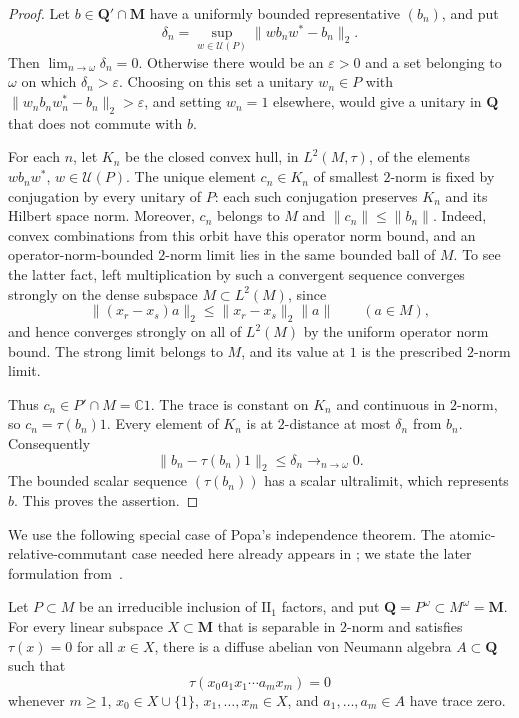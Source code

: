 \begin{proof}
Let $b\in\mathbf Q'\cap\mathbf M$ have a uniformly bounded
representative $(b_n)$, and put
\[
  \delta_n=\sup_{w\in\mathcal U(P)}
       \|wb_nw^*-b_n\|_2.
\]
Then $\lim_{n\to\omega}\delta_n=0$.  Otherwise there would be an
$\varepsilon>0$ and a set belonging to $\omega$ on which
$\delta_n>\varepsilon$.  Choosing on this set a unitary
$w_n\in P$ with $\|w_nb_nw_n^*-b_n\|_2>\varepsilon$, and setting
$w_n=1$ elsewhere, would give a unitary in $\mathbf Q$ that does not
commute with $b$.

For each $n$, let $K_n$ be the closed convex hull, in $L^2(M,\tau)$,
of the elements $wb_nw^*$, $w\in\mathcal U(P)$.  The unique element
$c_n\in K_n$ of smallest $2$-norm is fixed by conjugation by every
unitary of $P$: each such conjugation preserves $K_n$ and its Hilbert
space norm.  Moreover, $c_n$ belongs to $M$ and
$\|c_n\|\leq\|b_n\|$.  Indeed, convex combinations from this orbit
have this operator norm bound, and an operator-norm-bounded
$2$-norm limit lies in the same bounded ball of $M$.  To see the latter
fact, left multiplication by such a convergent sequence converges
strongly on the dense subspace $M\subset L^2(M)$, since
\[
  \|(x_r-x_s)a\|_2\leq\|x_r-x_s\|_2\|a\|
  \qquad(a\in M),
\]
and hence converges strongly on all of $L^2(M)$ by the uniform
operator norm bound.  The strong limit belongs to $M$, and its value
at $1$ is the prescribed $2$-norm limit.

Thus $c_n\in P'\cap M=\mathbb C1$.  The trace is constant on $K_n$
and continuous in $2$-norm, so $c_n=\tau(b_n)1$.  Every element of
$K_n$ is at $2$-distance at most $\delta_n$ from $b_n$.  Consequently
\[
  \|b_n-\tau(b_n)1\|_2\leq\delta_n\longrightarrow_{n\to\omega}0.
\]
The bounded scalar sequence $(\tau(b_n))$ has a scalar ultralimit,
which represents $b$.  This proves the assertion.
\end{proof}

We use the following special case of Popa's independence theorem.
The atomic-relative-commutant case needed here already appears in
\cite[Lemma~1.4 and Theorem~2.1]{Popa1995}; we state the later
formulation from~\cite[Theorem~0.1(a)]{Popa2014}.

\begin{theorem}
\label{thm:popa-independence}
Let $P\subset M$ be an irreducible inclusion of $\mathrm{II}_1$
factors, and put $\mathbf Q=P^\omega\subset M^\omega=\mathbf M$.
For every linear subspace $X\subset\mathbf M$ that is separable in
$2$-norm and satisfies $\tau(x)=0$ for all $x\in X$, there is a
diffuse abelian von Neumann algebra $A\subset\mathbf Q$ such that
\begin{equation}
\label{eq:popa-independence}
  \tau(x_0a_1x_1\cdots a_mx_m)=0
\end{equation}
whenever $m\geq1$, $x_0\in X\cup\{1\}$,
$x_1,\ldots,x_m\in X$, and $a_1,\ldots,a_m\in A$ have trace zero.
\end{theorem}

